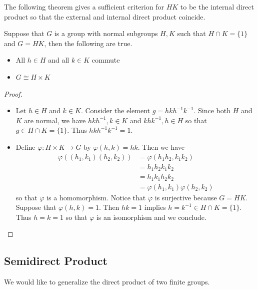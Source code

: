 \documentclass[a4paper]{article}
\begin{document}
The following theorem gives a sufficient criterion for $HK$ to be the internal direct product so that the external and internal direct product coincide. 

\begin{thm}{}{} Suppose that $G$ is a group with normal subgroups $H,K$ such that $H\cap K=\{1\}$ and $G=HK$, then the following are true. 
\begin{itemize}
\item All $h\in H$ and all $k\in K$ commute
\item $G\cong H\times K$
\end{itemize} 
\begin{proof}~\\
\begin{itemize}
\item Let $h\in H$ and $k\in K$. Consider the element $g=hkh^{-1}k^{-1}$. Since both $H$ and $K$ are normal, we have $hkh^{-1},k\in K$ and $khk^{-1},h\in H$ so that $g\in H\cap K=\{1\}$. Thus $hkh^{-1}k^{-1}=1$. 
\item Define $\varphi:H\times K\to G$ by $\varphi(h,k)=hk$. Then we have 
\begin{align*}
\varphi((h_1,k_1)(h_2,k_2))&=\varphi(h_1h_2,k_1k_2)\\
&=h_1h_2k_1k_2\\
&=h_1k_1h_2k_2\\
&=\varphi(h_1,k_1)\varphi(h_2,k_2)
\end{align*}
so that $\varphi$ is a homomorphism. Notice that $\varphi$ is surjective because $G=HK$. Suppose that $\varphi(h,k)=1$. Then $hk=1$ implies $h=k^{-1}\in H\cap K=\{1\}$. Thus $h=k=1$ so that $\varphi$ is an isomorphism and we conclude. 
\end{itemize}
\end{proof}
\end{thm}

\subsection{Semidirect Product}
We would like to generalize the direct product of two finite groups. 
\end{document}
